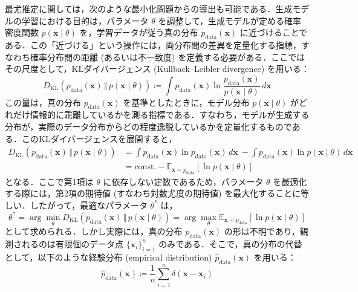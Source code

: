 \documentclass[titlepage]{ltjsbook}
\begin{document}
最尤推定に関しては，次のような最小化問題からの導出も可能である．生成モデルの学習における目的は，パラメータ $\theta$ を調整して，生成モデルが定める確率密度関数 $p(\mathbf{x} \mid \theta)$ を，学習データが従う真の分布 $p_{\mathrm{data}}(\mathbf{x})$ に近づけることである．この「近づける」という操作には，両分布間の差異を定量化する指標，すなわち確率分布間の距離 (あるいは不一致度) を定義する必要がある．ここではその尺度として，KLダイバージェンス (Kullback–Leibler divergence) を用いる：
\begin{equation}
D_{\mathrm{KL}}\left(p_{\mathrm{data}}(\mathbf{x}) \,\Vert\, p(\mathbf{x} \mid \theta)\right)
\coloneq \int p_{\mathrm{data}}(\mathbf{x}) \ln \frac{p_{\mathrm{data}}(\mathbf{x})}{p(\mathbf{x}\mid \theta)} \, d\mathbf{x}
\end{equation}
この量は，真の分布 $p_{\mathrm{data}}(\mathbf{x})$ を基準としたときに，モデル分布 $p(\mathbf{x}\mid \theta)$ がどれだけ情報的に乖離しているかを測る指標である．すなわち，モデルが生成する分布が，実際のデータ分布からどの程度逸脱しているかを定量化するものである．このKLダイバージェンスを展開すると，
\begin{align}
D_{\mathrm{KL}}\left(p_{\mathrm{data}}(\mathbf{x}) \,\Vert\, p(\mathbf{x}\mid \theta)\right)
&= \int p_{\mathrm{data}}(\mathbf{x}) \ln p_{\mathrm{data}}(\mathbf{x}) \, d\mathbf{x} 
\ - \int p_{\mathrm{data}}(\mathbf{x}) \ln p(\mathbf{x}\mid \theta) \, d\mathbf{x} \\
&= \text{const.} - \mathbb{E}_{\mathbf{x} \sim p_{\mathrm{data}}} \left[ \ln p(\mathbf{x}\mid \theta) \right]
\end{align}
となる．ここで第1項は $\theta$ に依存しない定数であるため，パラメータ $\theta$ を最適化する際には，第2項の期待値 (すなわち対数尤度の期待値) を最大化することに等しい．したがって，最適なパラメータ $\theta^*$ は，
\begin{equation}
\theta^* = \arg\min_\theta D_{\mathrm{KL}}\left(p_{\mathrm{data}}(\mathbf{x}) \,\Vert\, p(\mathbf{x}\mid \theta)\right)
= \arg\max_\theta \mathbb{E}_{\mathbf{x} \sim p_{\mathrm{data}}} \left[ \ln p(\mathbf{x}\mid \theta) \right]
\end{equation}
として求められる．しかし実際には，真の分布 $p_{\mathrm{data}}(\mathbf{x})$ の形は不明であり，観測されるのは有限個のデータ点 $\{\mathbf{x}_i\}_{i=1}^n$ のみである．そこで，真の分布の代替として，以下のような経験分布 (empirical distribution)  $\hat{p}_{\mathrm{data}}(\mathbf{x})$ を用いる：
\begin{equation}
\hat{p}_{\mathrm{data}}(\mathbf{x}) \coloneq \frac{1}{n} \sum_{i=1}^n \delta(\mathbf{x} - \mathbf{x}_i)
\end{equation}
\end{document}
